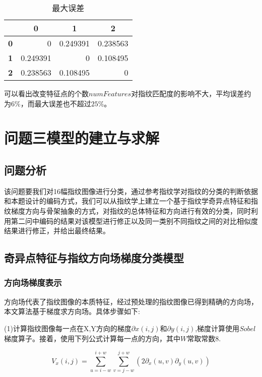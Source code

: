 \documentclass[withoutpreface,bwprint]{cumcmthesis} %
\begin{document}
\begin{table}[h!]
  \centering
  \caption{最大误差}
    \begin{tabular}{crrr}
    \toprule
          & \multicolumn{1}{c}{\textbf{0}} & \multicolumn{1}{c}{\textbf{1}} & \multicolumn{1}{c}{\textbf{2}} \\
    \midrule
    \textbf{0} & 0     & 0.249391 & 0.238563 \\
    \textbf{1} & 0.249391 & 0     & 0.108495 \\
    \textbf{2} & 0.238563 & 0.108495 & 0 \\
    \bottomrule
    \end{tabular}%
  \label{tab:maxErr}%
\end{table}%
可以看出改变特征点的个数$numFeatures$对指纹匹配度的影响不大，平均误差约为$6\%$，而最大误差也不超过$25\%$。



\section{问题三模型的建立与求解}
\subsection{问题分析}
该问题要我们对16幅指纹图像进行分类，通过参考指纹学对指纹的分类的判断依据和本题设计的编码方式，我们可以从指纹学上建立一个基于指纹学奇异点特征和指纹梯度方向与骨架抽象的方式，对指纹的总体特征和方向进行有效的分类，同时利用第二问中编码的结果对该模型进行修正以及同一类别不同指纹之间的对比相似度结果进行修正，并给出最终结果。
\subsection{奇异点特征与指纹方向场梯度分类模型}
\subsubsection{方向场梯度表示}
方向场代表了指纹图像的本质特征，经过预处理的指纹图像已得到精确的方向场，本文算法基于梯度求方向场。具体步骤如下:

(1)计算指纹图像每一点在X,Y方向的梯度$\partial$$x(i,j)$和$\partial$$y(i,j)$,梯度计算使用$Sobel$梯度算子。接着，使用下列公式计算每一点的方向，其中$W$常取常数8.


\begin{equation}
V_{x}(i, j)=\sum_{u=i-w}^{i+w}\sum_{v=j-w}^{j+w}\left(2 \partial_{x}(u, v) \partial_{y}(u, v)\right) 
\end{equation}
\end{document}
